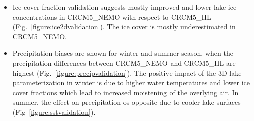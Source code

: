 \documentclass[a0b,landscape]{a0poster}
\begin{document}
\begin{multicols*}{4}
\begin{itemize}
  \item Ice cover fraction validation suggests mostly improved and lower lake ice concentrations in CRCM5\_NEMO with respect to CRCM5\_HL (Fig.~\ref{figure:ice2dvalidation}).
  The ice cover is mostly underestimated in CRCM5\_NEMO.
  \item Precipitation biases are shown for winter and summer season, when the precipitation differences between CRCM5\_NEMO and CRCM5\_HL are highest (Fig.~\ref{figure:precipvalidation}).
  The positive impact of the 3D lake parameterization in winter is due to higher water temperatures and lower ice cover fractions which lead to increased moistening of the overlying air.
  In summer, the effect on precipitation os opposite due to cooler lake surfaces (Fig~\ref{figure:sstvalidation}).
\end{itemize}


\noindent
{}
%
\hfill
%



\end{multicols*}
\end{document}
